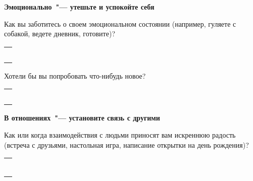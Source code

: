 \vspace{5ex}

{\large \textbf{Эмоционально~"--- утешьте и успокойте себя}}

\begin{itemize}
	\itemWritingHand Как вы заботитесь о своем эмоциональном состоянии (например, гуляете с собакой, ведете дневник, готовите)?
\end{itemize}

\setlength{\extrarowheight}{2mm}
\begin{tabularx}{0.96\textwidth}{X}
	\\
	\arrayrulecolor{gray}\hline\\
	\hline\\
	\hline\\
	\hline\\
	\hline\\
	\hline\\
\end{tabularx}
\setlength{\extrarowheight}{0mm}

\begin{itemize}
	\itemWritingHand Хотели бы вы попробовать что-нибудь новое?
\end{itemize}

\setlength{\extrarowheight}{2mm}
\begin{tabularx}{0.96\textwidth}{X}
	\\
	\arrayrulecolor{gray}\hline\\
	\hline\\
	\hline\\
	\hline\\
	\hline\\
	\hline\\
\end{tabularx}
\setlength{\extrarowheight}{0mm}

\vspace{5ex}

{\large \textbf{В отношениях~"--- установите связь с другими}}

\begin{itemize}
	\itemWritingHand Как или когда взаимодействия с людьми приносят вам искреннюю радость (встреча с друзьями, настольная игра, написание открытки на день рождения)?
\end{itemize}

\setlength{\extrarowheight}{2mm}
\begin{tabularx}{0.96\textwidth}{X}
	\\
	\arrayrulecolor{gray}\hline\\
	\hline\\
	\hline\\
	\hline\\
	\hline\\
	\hline\\
	\hline\\
\end{tabularx}
\setlength{\extrarowheight}{0mm}

